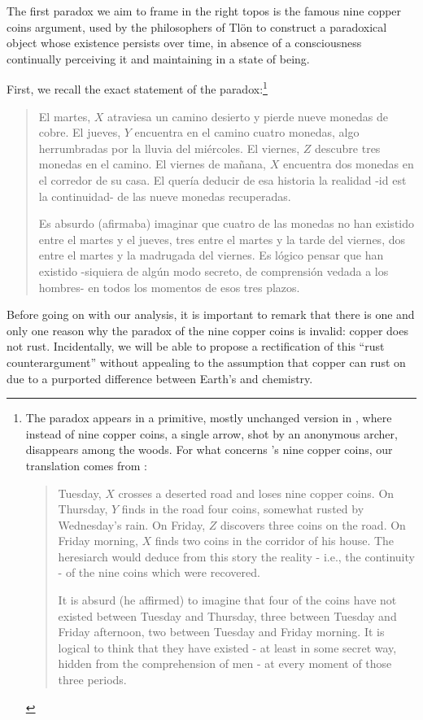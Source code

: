 The first paradox we aim to frame in the right topos is the famous nine copper coins argument, used by the philosophers of Tlön to construct a paradoxical object whose existence persists over time, in absence of a consciousness continually perceiving it and maintaining in a state of being.
\begin{example}\label{bla}
  First, we recall the exact statement of the paradox:\footnote{The paradox appears in a primitive, mostly unchanged version in \cite{borges1997otras}, where instead of nine copper coins, a single arrow, shot by an anonymous archer, disappears among the woods. For what concerns \tlon's  nine copper coins, our translation comes from \cite{tlonEN}:
    \begin{quote}
      \hspace{.5em} Tuesday, $X$ crosses a deserted road and loses nine copper coins. On Thursday, $Y$ finds in the road four coins, somewhat rusted by Wednesday's rain. On Friday, $Z$ discovers three coins on the road. On Friday morning, $X$ finds two coins in the corridor of his house. The heresiarch would deduce from this story the reality - i.e., the continuity - of the nine coins which were recovered.

      \hspace{.5em} It is absurd (he affirmed) to imagine that four of the coins have not existed between Tuesday and Thursday, three between Tuesday and Friday afternoon, two between Tuesday and Friday morning. It is logical to think that they have existed - at least in some secret way, hidden from the comprehension of men - at every moment of those three periods.
    \end{quote}}
  \begin{quote}
    El martes, $X$ atraviesa un camino desierto y pierde nueve monedas de cobre.
    El jueves, $Y$ encuentra en el camino cuatro monedas, algo herrumbradas por la lluvia del miércoles. El viernes, $Z$ descubre tres monedas en el camino. El viernes de mañana, $X$ encuentra dos monedas en el corredor de su casa. El  quería deducir de esa historia la realidad -id est la continuidad- de las nueve monedas recuperadas.

    Es absurdo (afirmaba) imaginar que cuatro de las monedas no han existido entre el martes y el jueves, tres entre el martes y la tarde del viernes, dos entre el martes y la madrugada del viernes. Es lógico pensar que han existido -siquiera de algún modo secreto, de comprensión vedada a los hombres- en todos los momentos de esos tres plazos.
  \end{quote}
  Before going on with our analysis, it is important to remark that there is one and only one reason why the paradox of the nine copper coins is invalid: copper does not rust. Incidentally, we will be able to propose a rectification of this ``rust counterargument'' without appealing to the assumption that copper can rust on \tlon due to a purported difference between Earth's and \tlonian chemistry.


\end{example}
